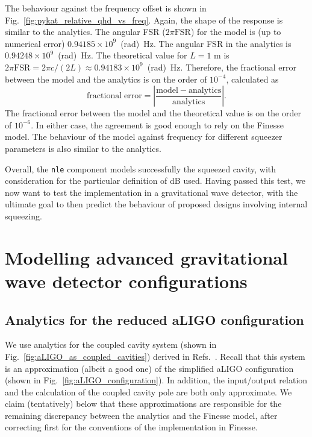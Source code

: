 \documentclass[aps,pra,superscriptaddress,reprint,nofootinbib]{revtex4-1}
\newcommand{\abs}[1]{\left\lvert #1 \right\rvert}
\newcommand{\code}[1]{\texttt{#1}}
\begin{document}
The behaviour against the frequency offset is shown in Fig.~\ref{fig:pykat_relative_qhd_vs_freq}. Again, the shape of the response is similar to the analytics.
The angular FSR ($2 \pi \mathrm{FSR}$) for the model is (up to numerical error) $0.94185 \times 10^9$~(rad)~Hz.
The angular FSR in the analytics is $0.94248 \times 10^9$~(rad)~Hz.
The theoretical value for $L = 1$ m is $2 \pi \mathrm{FSR} = 2 \pi c/(2 L) \approx 0.94183 \times 10^9$~(rad)~Hz.
Therefore, the fractional error between the model and the analytics is on the order of $10^{-4}$, calculated as
\begin{equation}
\mathrm{fractional\; error} = \abs{\frac{\mathrm{model} - \mathrm{analytics}}{\mathrm{analytics}}}.
\end{equation}
The fractional error between the model and the theoretical value is on the order of $10^{-6}$. In either case, the agreement is good enough to rely on the Finesse model.
The behaviour of the model against frequency for different squeezer parameters is also similar to the analytics.


Overall, the \code{nle} component models successfully the squeezed cavity, with consideration for the particular definition of dB used. Having passed this test, we now want to test the implementation in a gravitational wave detector, with the ultimate goal to then predict the behaviour of proposed designs involving internal squeezing.


\section{Modelling advanced gravitational wave detector configurations}
\label{sec:aLIGOcomparison}

\subsection{Analytics for the reduced aLIGO configuration}

We use analytics for the coupled cavity system (shown in Fig.~\ref{fig:aLIGO_as_coupled_cavities}) derived in Refs.~\cite{Korobko_2019,SOMIYA2016521}. Recall that this system is an approximation (albeit a good one) of the simplified aLIGO configuration (shown in Fig.~\ref{fig:aLIGO_configuration}). In addition, the input/output relation and the calculation of the coupled cavity pole are both only approximate. We claim (tentatively) below that these approximations are responsible for the remaining discrepancy between the analytics and the Finesse model, after correcting first for the conventions of the implementation in Finesse.
\end{document}
